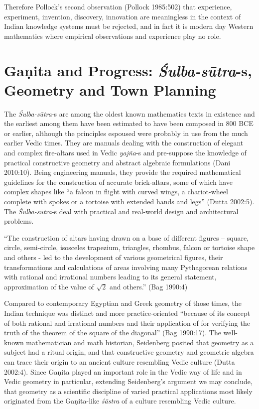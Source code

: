 Therefore Pollock's second observation (Pollock 1985:502) that experience, experiment, invention, discovery, innovation are meaningless in the context of Indian knowledge systems must be rejected, and in fact it is modern day Western mathematics where empirical observations and experience play no role.

\section*{Gaṇita and Progress: {\sl\bfseries Śulba-sūtra}-s, Geometry and Town Planning}

The {\sl Śulba-sūtra}-s are among the oldest known mathematics texts in existence and the earliest among them have been estimated to have been composed in 800 BCE or earlier, although the principles espoused were probably in use from the much earlier Vedic times. They are manuals dealing with the construction of elegant and complex fire-altars used in Vedic {\sl yajña}-s and pre-suppose the knowledge of practical constructive geometry and abstract algebraic formulations (Dani 2010:10). Being engineering manuals, they provide the required mathematical guidelines for the construction of accurate brick-altars, some of which have complex shapes like ``a falcon in flight with curved wings, a chariot-wheel complete with spokes or a tortoise with extended hands and legs'' (Dutta 2002:5). The {\sl Śulba-sūtra}-s deal with practical and real-world design and architectural problems. 
\begin{myquote}
``The construction of altars having drawn on a base of different figures -- square, circle, semi-circle, isosceles trapezium, triangles, rhombus, falcon or tortoise shape and others - led to the development of various geometrical figures, their transformations and calculations of areas involving many Pythagorean relations with rational and irrational numbers leading to its general statement, approximation of the value of $\surd 2$ and others.''
\hfill	(Bag 1990:4)
\end{myquote}

Compared to contemporary Egyptian and Greek geometry of those times, the Indian technique was distinct and more practice-oriented ``because of its concept of both rational and irrational numbers and their application of for verifying the truth of the theorem of the square of the diagonal'' (Bag 1990:17). The well-known mathematician and math historian, Seidenberg posited that geometry as a subject had a ritual origin, and that constructive geometry and geometric algebra can trace their origin to an ancient culture resembling Vedic culture (Dutta 2002:4). Since Gaṇita played an important role in the Vedic way of life and in Vedic geometry in particular, extending Seidenberg’s argument we may conclude, that geometry as a scientific discipline of varied practical applications most likely originated from the Gaṇita-like {\sl śāstra} of a culture resembling Vedic culture.

